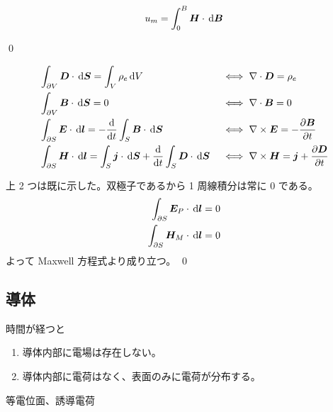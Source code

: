 \documentclass[uplatex,dvipdfmx,a4paper,11pt]{jlreq}
\makeatletter
\newcommand{\EE}{\bm{E}}
\newcommand{\BB}{\bm{B}}
\newcommand{\DD}{\bm{D}}
\newcommand{\HH}{\bm{H}}
\renewcommand{\SS}{\bm{S}}
\newcommand{\vnabla}{\mathbf{\nabla}}
\numberwithin{equation}{section}
\theoremstyle{definition}
\renewenvironment{proof}[1][\proofname]{\par
  \normalfont
  \topsep6\p@\@plus6\p@ \trivlist
  \item[\hskip\labelsep{\bfseries #1}\@addpunct{\bfseries}]\ignorespaces\quad\par
}{%
  \qed\endtrivlist\@endpefalse
}
\renewcommand\proofname{証明}
\makeatother
\begin{document}
\begin{theorem}
  \begin{align}
    u_{m} = \int_0^B\HH\cdot\dl{\BB}
  \end{align}
\end{theorem}
\begin{proof}

\end{proof}

\begin{theorem}
  \begin{alignat}{3}
     & \int_{\partial V}\DD\cdot\dl{\SS} = \int_V\rho_e\dl{V}                                              &  & \iff \vnabla\cdot\DD  = \rho_e                  \\
     & \int_{\partial V}\BB\cdot\dl{\SS} = 0                                                               &  & \iff \vnabla\cdot\BB  = 0                       \\
     & \int_{\partial S}\EE\cdot\dl{\bm{l}} = -\diff{}{t}\int_S\BB\cdot\dl{\SS}                            &  & \iff \vnabla\times\EE = -\diffp{\BB}{t}         \\
     & \int_{\partial S}\HH\cdot\dl{\bm{l}} = \int_S\bm{j}\cdot\dl{\SS} + \diff{}{t}\int_S\DD\cdot\dl{\SS} &  & \iff \vnabla\times\HH = \bm{j} + \diffp{\DD}{t}
  \end{alignat}
\end{theorem}
\begin{proof}
  上 2 つは既に示した。双極子であるから 1 周線積分は常に $0$ である。
  \begin{align}
    \int_{\partial S}\EE_P\cdot\dl{\bm{l}} = 0 \\
    \int_{\partial S}\HH_M\cdot\dl{\bm{l}} = 0
  \end{align}
  よって Maxwell 方程式より成り立つ。
\end{proof}


\subsection{導体}
\begin{definition}[導体]
  時間が経つと
  \begin{enumerate}
    \item 導体内部に電場は存在しない。
    \item 導体内部に電荷はなく、表面のみに電荷が分布する。
  \end{enumerate}
  等電位面、誘導電荷
\end{definition}
\end{document}
